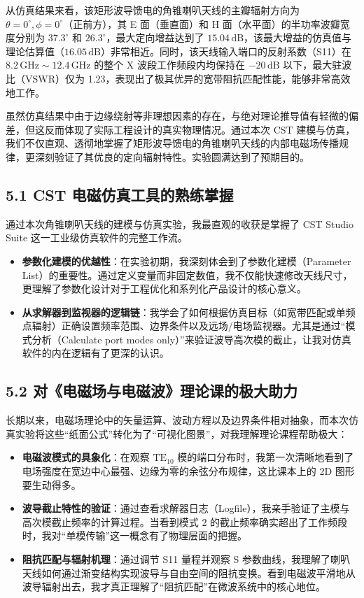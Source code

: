 \documentclass{ctexart}
\newcounter{makepart}
\begin{document}
从仿真结果来看，该矩形波导馈电的角锥喇叭天线的主瓣辐射方向为 $\theta=0^\circ, \phi=0^\circ$（正前方），其 E 面（垂直面）和 H 面（水平面）的半功率波瓣宽度分别为 $37.3^\circ$ 和 $26.3^\circ$，最大定向增益达到了 $15.04\,\text{dB}$，该最大增益的仿真值与理论估算值（$16.05\,\text{dB}$）非常相近。同时，该天线输入端口的反射系数（S11）在 $8.2\,\text{GHz} \sim 12.4\,\text{GHz}$ 的整个 X 波段工作频段内均保持在 $-20\,\text{dB}$ 以下，最大驻波比（VSWR）仅为 1.23，表现出了极其优异的宽带阻抗匹配性能，能够非常高效地工作。

虽然仿真结果中由于边缘绕射等非理想因素的存在，与绝对理论推导值有轻微的偏差，但这反而体现了实际工程设计的真实物理情况。通过本次 CST 建模与仿真，我们不仅直观、透彻地掌握了矩形波导馈电的角锥喇叭天线的内部电磁场传播规律，更深刻验证了其优良的定向辐射特性。实验圆满达到了预期目的。


\subsection*{5.1 CST 电磁仿真工具的熟练掌握}
通过本次角锥喇叭天线的建模与仿真实验，我最直观的收获是掌握了 CST Studio Suite 这一工业级仿真软件的完整工作流。
\begin{itemize}
    \item \textbf{参数化建模的优越性}：在实验初期，我深刻体会到了参数化建模（Parameter List）的重要性。通过定义变量而非固定数值，我不仅能快速修改天线尺寸，更理解了参数化设计对于工程优化和系列化产品设计的核心意义。
    \item \textbf{从求解器到监视器的逻辑链}：我学会了如何根据仿真目标（如宽带匹配或单频点辐射）正确设置频率范围、边界条件以及远场/电场监视器。尤其是通过“模式分析（Calculate port modes only）”来验证波导高次模的截止，让我对仿真软件的内在逻辑有了更深的认识。
\end{itemize}

\subsection*{5.2 对《电磁场与电磁波》理论课的极大助力}
长期以来，电磁场理论中的矢量运算、波动方程以及边界条件相对抽象，而本次仿真实验将这些“纸面公式”转化为了“可视化图景”，对我理解理论课程帮助极大：
\begin{itemize}
    \item \textbf{电磁波模式的具象化}：在观察 $\text{TE}_{10}$ 模的端口分布时，我第一次清晰地看到了电场强度在宽边中心最强、边缘为零的余弦分布规律，这比课本上的 2D 图形要生动得多。
    \item \textbf{波导截止特性的验证}：通过查看求解器日志（Logfile），我亲手验证了主模与高次模截止频率的计算过程。当看到模式 2 的截止频率确实超出了工作频段时，我对“单模传输”这一概念有了物理层面的把握。
    \item \textbf{阻抗匹配与辐射机理}：通过调节 S11 量程并观察 S 参数曲线，我理解了喇叭天线如何通过渐变结构实现波导与自由空间的阻抗变换。看到电磁波平滑地从波导辐射出去，我才真正理解了“阻抗匹配”在微波系统中的核心地位。
\end{itemize}
\end{document}
